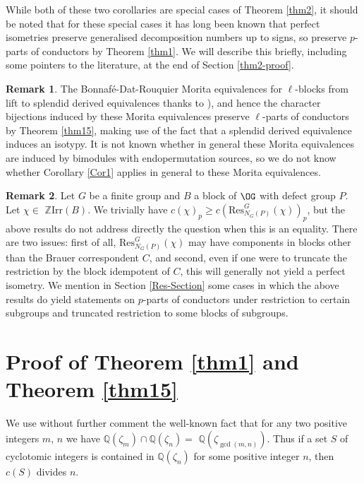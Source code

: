 \documentclass{amsart} %
\theoremstyle{plain}\newtheorem{Theorem}{Theorem}[section]
\theoremstyle{plain}\newtheorem{Conjecture}[Theorem]{Conjecture}
\theoremstyle{plain}\newtheorem{Corollary}[Theorem]{Corollary}
\theoremstyle{plain}\newtheorem{Lemma}[Theorem]{Lemma}
\theoremstyle{plain}\newtheorem{Proposition}[Theorem]{Proposition}
\theoremstyle{definition}\newtheorem{Definition}[Theorem]{Definition}
\theoremstyle{definition}\newtheorem{Example}[Theorem]{Example}
\theoremstyle{definition}\newtheorem{Examples}[Theorem]{Examples}
\theoremstyle{definition}\newtheorem{Remark}[Theorem]{Remark}
\theoremstyle{definition}\newtheorem{Remarks}[Theorem]{Remarks}
\theoremstyle{plain}\newtheorem{Statement}[Theorem]{}
\def\Q{{\mathbb Q}}               \def\bV{\mathbf{V}}
\def\Z{{\mathbb Z}}
\def\Irr{\mathrm{Irr}}           \def\tenK{\otimes_K}
\def\Res{\mathrm{Res}}           \def\tenOR{\otimes_{\mathcal{O}R}}
\begin{document}
While both of these two corollaries are special cases of Theorem \ref{thm2},
it should be noted that  for these special cases  it has long
been known that   perfect isometries 
preserve generalised decomposition numbers up to signs, so preserve $p$-parts of
conductors by Theorem \ref{thm1}. We will describe this briefly, including
some pointers to the literature,
at the end of Section \ref{thm2-proof}. 

\begin{Remark}
The Bonnaf\'e-Dat-Rouquier Morita equivalences for $\ell$-blocks 
from  \cite[Theorem 7.5]{BDR}  lift to splendid derived equivalences 
thanks to \cite[Theorem 7.6]{BDR}), and hence the character bijections 
induced by these Morita equivalences  preserve $\ell$-parts of conductors 
by Theorem \ref{thm15}, making use of  the fact that a splendid derived 
equivalence induces an isotypy.   It is not known whether in general these
Morita equivalences are induced by bimodules with endopermutation sources,
so we do not know whether Corollary \ref{Cor1} applies in general to these
Morita equivalences. 
\end{Remark}

\begin{Remark}
Let $G$ be a finite group and $B$ a block of $\OG$ with defect group $P$.
Let $\chi\in$ $\Z\Irr(B)$. We trivially have $c(\chi)_p \geq c(\Res^G_{N_G(P)}(\chi))_p$,
but the above results do not address directly the question when this is an equality. 
There are two issues: first of all, 
$\Res^G_{N_G(P)}(\chi)$  may have components in blocks other than the Brauer 
correspondent $C$, and second, even if one were to truncate the restriction by 
the block idempotent of $C$, this will generally not yield a perfect isometry. 
We mention in Section \ref{Res-Section}  some cases in which the above 
results do yield statements on $p$-parts of conductors under restriction to certain 
subgroups and truncated restriction to some blocks of subgroups.
\end{Remark}


\section{Proof of Theorem \ref{thm1} and Theorem \ref{thm15}}  %
\label{thm1-proof}%

We use without further comment the well-known fact  that for any two positive 
integers $m$, $n$
we have $\Q(\zeta_m)\cap\Q(\zeta_n)=$ $\Q(\zeta_{\gcd(m,n)})$. Thus if a
set $S$ of cyclotomic integers is contained in $\Q(\zeta_n)$ for some positive
integer $n$, then $c(S)$ divides $n$. 
\end{document}
